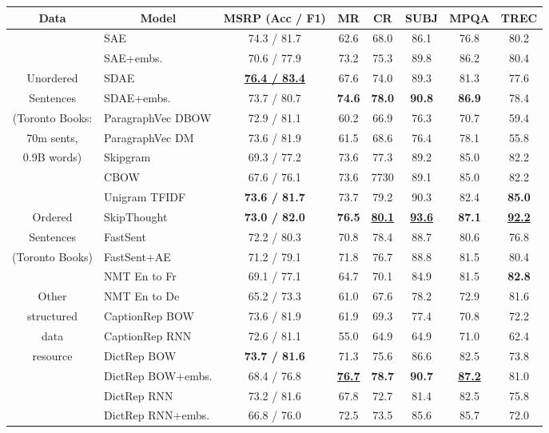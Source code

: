 \documentclass[11pt,letterpaper]{article}
\begin{document}
\begin{table*}[ht]
\small
\newcommand{\mc}[1]{\multicolumn{1}{l|}{#1}}
  \begin{center}

      {
        \begin{tabular}{c|l|cccccc}
           \multicolumn{1}{c}{Data} & \multicolumn{1}{|c|}{Model} & MSRP (Acc / F1) & MR & CR & SUBJ & MPQA & TREC 
          \\
          \hline
          \hline
          & SAE & 74.3 / 81.7	& 62.6	& 68.0	& 86.1	& 76.8	& 80.2 \\
          & SAE+embs. & 70.6 / 77.9	& 73.2	& 75.3	& 89.8	& 86.2	& 80.4 \\
          Unordered  & SDAE & \bf \underline{76.4 / 83.4}	& 67.6	& 74.0	& 89.3	& 81.3	& 77.6 \\
         Sentences & SDAE+embs. & 73.7 / 80.7	& \bf 74.6	&  \bf 78.0	& \bf 90.8	& \bf 86.9	& 78.4 \\
          (Toronto Books: &ParagraphVec DBOW & 72.9	/ 81.1	& 60.2	& 66.9	& 76.3	& 70.7	& 59.4 \\
        70m sents, & ParagraphVec DM & 73.6 / 81.9	& 61.5	& 68.6	& 76.4	& 78.1 & 55.8\\
         0.9B words) &Skipgram & 69.3 / 77.2	& 73.6	& 77.3	& 89.2	& 85.0	& 82.2 \\
         &CBOW & 67.6 / 76.1	& 73.6	& 7730 & 89.1	& 85.0 & 82.2 \\
           &Unigram TFIDF & \bf 73.6 /  81.7	& 73.7	& 79.2	& 90.3	& 82.4	& \bf 85.0 \\
          \hline 
             Ordered    & SkipThought & \bf 73.0 / 82.0 & \bf 76.5 & \bf  \underline{80.1}	& \bf \underline{93.6}	& \bf 87.1	& \bf \underline{92.2} \\
       Sentences &FastSent & 72.2 / 80.3	& 70.8	& 78.4	& 88.7	&80.6 & 76.8 \\
         (Toronto Books) &FastSent+AE & 71.2 / 79.1	& 71.8	& 76.7	& 88.8	& 81.5	& 80.4  \\
          \hline 
          &NMT En to Fr & 69.1 / 77.1	& 64.7	& 70.1	& 84.9	& 81.5	& \bf 82.8 \\
        Other  &NMT En to De & 65.2 / 73.3 & 61.0 & 67.6	& 78.2	& 72.9 & 81.6 \\
          structured & CaptionRep BOW & 73.6 / 81.9	& 61.9	& 69.3	& 77.4	& 70.8	& 72.2  \\
          data & CaptionRep RNN & 72.6 / 81.1 & 55.0 & 64.9 & 64.9 & 71.0 & 62.4 \\
           resource &DictRep BOW & \bf 73.7 / 81.6	& 71.3	& 75.6	& 86.6	& 82.5 & 73.8 \\
          &DictRep BOW+embs. & 68.4 / 76.8	&  \bf \underline{76.7}	& \bf 78.7	& \bf 90.7	& \bf \underline{87.2}	& 81.0  \\
           &DictRep RNN & 73.2	/ 81.6	& 67.8	& 72.7	& 81.4	& 82.5	& 75.8 \\
           &DictRep RNN+embs. & 66.8	 / 76.0 & 72.5	& 73.5	& 85.6	& 85.7 & 72.0 \\
          \hline   


\end{tabular}}
\end{center}
\end{table*}
\end{document}
